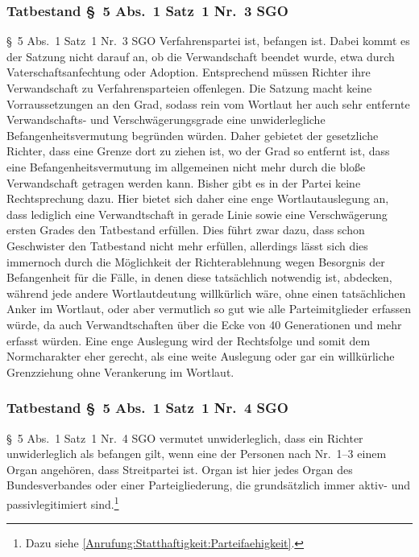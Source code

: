\subsubsection{Tatbestand \S~5 Abs.~1 Satz~1 Nr.~3 SGO}
\label{Zusammensetzung:Spruchkoerper:Befangenheitsvermutung:Nr3}
\S~5 Abs.~1 Satz~1 Nr.~3 SGO Verfahrenspartei ist, befangen ist.
Dabei kommt es der Satzung nicht darauf an, ob die Verwandschaft beendet wurde, etwa durch Vaterschaftsanfechtung oder Adoption.
Entsprechend müssen Richter ihre Verwandschaft zu Verfahrensparteien offenlegen.
Die Satzung macht keine Vorraussetzungen an den Grad, sodass rein vom Wortlaut her auch sehr entfernte Verwandschafts- und Verschwägerungsgrade eine unwiderlegliche Befangenheitsvermutung begründen würden.
Daher gebietet der gesetzliche Richter, dass eine Grenze dort zu ziehen ist, wo der Grad so entfernt ist, dass eine Befangenheitsvermutung im allgemeinen nicht mehr durch die bloße Verwandschaft getragen werden kann.
Bisher gibt es in der Partei keine Rechtsprechung dazu.
Hier bietet sich daher eine enge Wortlautauslegung an, dass lediglich eine Verwandtschaft in gerade Linie sowie eine Verschwägerung ersten Grades den Tatbestand erfüllen.
Dies führt zwar dazu, dass schon Geschwister den Tatbestand nicht mehr erfüllen, allerdings lässt sich dies immernoch durch die Möglichkeit der Richterablehnung wegen Besorgnis der Befangenheit für die Fälle, in denen diese tatsächlich notwendig ist, abdecken, während jede andere Wortlautdeutung willkürlich wäre, ohne einen tatsächlichen Anker im Wortlaut, oder aber vermutlich so gut wie alle Parteimitglieder erfassen würde, da auch Verwandtschaften über die Ecke von 40 Generationen und mehr erfasst würden.
Eine enge Auslegung wird der Rechtsfolge und somit dem Normcharakter eher gerecht, als eine weite Auslegung oder gar ein willkürliche Grenzziehung ohne Verankerung im Wortlaut.

\subsubsection{Tatbestand \S~5 Abs.~1 Satz~1 Nr.~4 SGO}
\label{Zusammensetzung:Spruchkoerper:Befangenheitsvermutung:Nr4}
\S~5 Abs.~1 Satz~1 Nr.~4 SGO vermutet unwiderleglich, dass ein Richter unwiderleglich als befangen gilt, wenn eine der Personen nach Nr.~1--3 einem Organ angehören, dass Streitpartei ist.
Organ ist hier jedes Organ des Bundesverbandes oder einer Parteigliederung, die grundsätzlich immer aktiv- und passivlegitimiert sind.\footnote{Dazu siehe \ref{Anrufung:Statthaftigkeit:Parteifaehigkeit}.}


